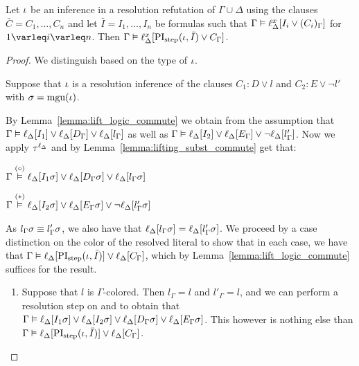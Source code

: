 \begin{lemma}
	\label{lemma:gamma_entails_step}
	Let $\iota$ be an inference in a resolution refutation of $\Gamma \cup \Delta$ using the clauses $\bar C = C_1, \dots, C_n$
	and let $\bar I = I_1, \dots, I_n$ be formulas such that 
	$\Gamma \entails \lifdelta{I_i \lor\nolinebreak (C_i)_\Gamma} $ for $1 \varleq i \varleq n$.
	Then
	$\Gamma \entails \lifdelta{\PIstep(\inference, \bar I) \lor\nolinebreak C_\Gamma} $.
\end{lemma}
\begin{proof}
	We distinguish based on the type of $\iota$.
	\begin{indproof}
			Suppose that $\iota$ is a resolution inference of the clauses $C_1: D \lor l$ and $C_2: E \lor \lnot l'$ with $\sigma = \operatorname{mgu}(\iota)$.

			By Lemma~\ref{lemma:lift_logic_commute} we obtain from the assumption that
			$\Gamma \vDash \ell_{\Delta}[I_1] \lor \ell_{\Delta}[D_\Gamma] \lor \ell_{\Delta}[l_\Gamma]$
			as well as 
			$\Gamma \vDash \ell_{\Delta}[I_2] \lor \ell_{\Delta}[E_\Gamma] \lor \lnot \ell_{\Delta}[l'_\Gamma]$.
			Now we apply $\tau^{\ell_\Delta}$ and by Lemma~\ref{lemma:lifting_subst_commute} get that:

			$\Gamma \stackrel{(\circ)}{\vDash} \ell_{\Delta}[I_1\sigma] \lor \ell_{\Delta}[D_\Gamma\sigma] \lor \ell_{\Delta}[l_\Gamma\sigma]$

			$\Gamma \stackrel{(*)}{\vDash} \ell_{\Delta}[I_2\sigma] \lor \ell_{\Delta}[E_\Gamma\sigma] \lor \lnot \ell_{\Delta}[l'_\Gamma\sigma]$

			As $l_\Gamma\sigma \equiv l'_\Gamma\sigma$,
			we also have that
			$\ell_{\Delta}[l_\Gamma\sigma] = \ell_{\Delta}[l'_\Gamma\sigma]$.
			We proceed by a case distinction on the color of the resolved literal to show that in each case, we have that
			$\Gamma \vDash \ell_{\Delta}[\operatorname{PI}_{\mathrm{step}}(\iota, \bar I)] \lor \ell_{\Delta}[C_\Gamma]$,
			which by Lemma~\ref{lemma:lift_logic_commute} suffices for the result.
			\begin{enumerate}
				\item Suppose that $l$ is $\Gamma$-colored.
					Then $l_\Gamma = l$ and $l'_\Gamma = l$, and we can perform a resolution step on \markA{} and \markB{} to obtain that
					$\Gamma \vDash
					\ell_{\Delta}[I_1\sigma] \lor
					\ell_{\Delta}[I_2\sigma] \lor 
					\ell_{\Delta}[D_\Gamma\sigma]  \lor
					\ell_{\Delta}[E_\Gamma\sigma]$.
					This however is nothing else than $\Gamma \vDash \ell_{\Delta}[\operatorname{PI}_{\mathrm{step}}(\iota, \bar I)] \lor \ell_{\Delta}[C_\Gamma]$.


\end{enumerate}
\end{indproof}
\end{proof}
